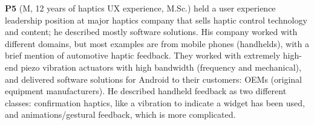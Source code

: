         \textbf{P5} (M, 12 years of haptics UX experience, M.Sc.) held a user experience leadership position at major haptics company that sells haptic control technology and content; he described mostly software solutions.
        His company worked with different domains, but most examples are from mobile phones (handhelds), with a brief mention of automotive haptic feedback.
        They worked with extremely high-end piezo vibration actuators with high bandwidth (frequency and mechanical), and delivered software solutions for Android to their customers: OEMs (original equipment manufacturers).
        He described handheld feedback as two different classes: confirmation haptics, like a vibration to indicate a widget has been used, and animations/gestural feedback, which is more complicated.
        

